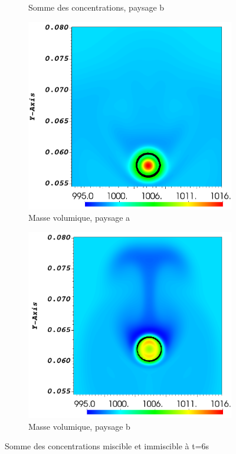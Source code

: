 \begin{figure}[H]
\begin{subfigure}[H]{0.47\textwidth}
		\caption{Somme des concentrations, paysage b}
	\end{subfigure}
	\begin{subfigure}[H]{0.47\textwidth}
	\centering
	\includegraphics[width=\textwidth]{figure/masse_vol_a_6s.png}
	\caption{Masse volumique, paysage a}
\end{subfigure} 
\begin{subfigure}[H]{0.47\textwidth}
	\centering
	\includegraphics[width=\textwidth]{figure/masse_vol_other_6s.png}
	\caption{Masse volumique, paysage b}
\end{subfigure}
	\caption{Somme des concentrations miscible et immiscible à t=6s}
	\label{fig:otherland_sommeConcent}
\end{figure}
